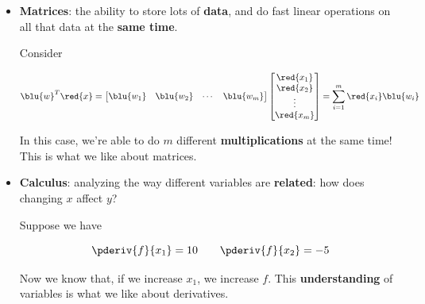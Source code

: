     \begin{itemize}
        \item \textbf{Matrices}: the ability to store lots of \textbf{data}, and do fast linear operations on all that data at the \textbf{same time}.
        
        \miniex Consider
        
        \begin{equation}
            \blu{w}^T\red{x} =
            \begin{bmatrix}
                \blu{w_1} & \blu{w_2} & \cdots & \blu{w_m}
            \end{bmatrix}
            \begin{bmatrix}
                \red{x_1} \\ \red{x_2} \\ \vdots \\ \red{x_m}
            \end{bmatrix}
            =
            \sum_{i=1}^m \red{x_i}\blu{w_i}
        \end{equation}
        
        In this case, we're able to do $m$ different \textbf{multiplications} at the same time! This is what we like about matrices.
        
        \item \textbf{Calculus}: analyzing the way different variables are \textbf{related}: how does changing $x$ affect $y$?
        
        \miniex Suppose we have 
        
        \begin{equation}
            \pderiv{f}{x_1}=10 \qquad 
            \pderiv{f}{x_2}=-5
        \end{equation}
        
        Now we know that, if we increase $x_1$, we increase $f$. This \textbf{understanding} of variables is what we like about derivatives.\\
    \end{itemize}
    
